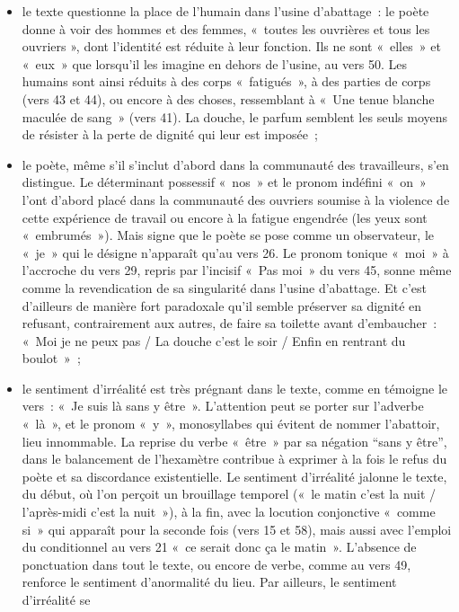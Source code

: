 {\vspace*{-10pt}\begin{itemize}
\item le texte questionne la place de l'humain dans l'usine d'abattage~: le poète
donne à voir des hommes et des femmes, «~toutes les ouvrières et tous les ouvriers
», dont l'identité est réduite à leur fonction. Ils ne sont «~elles~» et «~eux~» que lorsqu'il
les imagine en dehors de l'usine, au vers 50. Les humains sont ainsi réduits à des corps «~fatigués~», à des parties de corps (vers 43 et 44), ou encore à des choses,
ressemblant à «~Une tenue blanche maculée de sang~» (vers 41). La douche, le parfum
semblent les seuls moyens de résister à la perte de dignité qui leur est imposée~;
\item le poète, même s'il s'inclut d'abord dans la communauté des travailleurs, s'en
distingue. Le déterminant possessif «~nos~» et le pronom indéfini «~on~» l'ont d'abord
placé dans la communauté des ouvriers soumise à la violence de cette expérience de
travail ou encore à la fatigue engendrée (les yeux sont «~embrumés~»). Mais signe que
le poète se pose comme un observateur, le «~je~» qui le désigne n'apparaît qu'au vers
26. Le pronom tonique «~moi~» à l'accroche du vers 29, repris par l'incisif «~Pas moi~»
du vers 45, sonne même comme la revendication de sa singularité dans l'usine
d'abattage. Et c'est d'ailleurs de manière fort paradoxale qu'il semble préserver sa
dignité en refusant, contrairement aux autres, de faire sa toilette avant d'embaucher~:
«~Moi je ne peux pas / La douche c'est le soir / Enfin en rentrant du boulot~»~;
\item le sentiment d'irréalité est très prégnant dans le texte, comme en témoigne le
vers~: «~Je suis là sans y être~». L'attention peut se porter sur l'adverbe «~là~», et le
pronom «~y~», monosyllabes qui évitent de nommer l'abattoir, lieu innommable. La
reprise du verbe «~être~» par sa négation “sans y être”, dans le balancement de
l'hexamètre contribue à exprimer à la fois le refus du poète et sa discordance
existentielle. Le sentiment d'irréalité jalonne le texte, du début, où l'on perçoit un
brouillage temporel («~le matin c'est la nuit / l'après-midi c'est la nuit~»), à la fin, avec
la locution conjonctive «~comme si~» qui apparaît pour la seconde fois (vers 15 et 58),
mais aussi avec l'emploi du conditionnel au vers 21 «~ce serait donc ça le matin~».
L'absence de ponctuation dans tout le texte, ou encore de verbe, comme au vers 49,
renforce le sentiment d'anormalité du lieu. Par ailleurs, le sentiment d'irréalité se

\end{itemize}}
